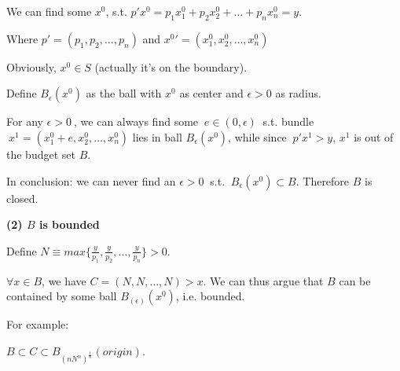 \documentclass{article}
\begin{document}
\vspace{2mm}

We can find some $x^0$, s.t. $p'x^0 = p_1x^0_1 + p_2x^0_2 + \ldots + p_nx^0_n = y$.

Where $p' = (p_1, p_2, \ldots, p_n)$ and ${x^0}' = (x^0_1, x^0_2, \ldots, x^0_n)$

Obviously, $x^0 \in  S$ (actually it's on the boundary).

\medskip

Define $B_{\epsilon}(x^0)$ as the ball with $x^0$ as center and $\epsilon > 0$ as radius.

For any $\epsilon > 0 \ $, we can always find some $ \ e \in (0, \epsilon) \ $ s.t. bundle 
$\ x^1 = (x^0_1 + e, x^0_2, \ldots, x^0_n)$ lies in ball $B_{\epsilon}(x^0)$, while since $\ p'x^1 > y$, 
$x^1$ is out of the budget set $B$.

\medskip

In conclusion: we can never find an $\epsilon > 0 \ $ s.t. $\ B_{\epsilon}(x^0) \subset B$. Therefore
$B$ is closed.

\bigskip

\textbf{(2) $B$ is bounded}

Define $N \equiv max\{\frac{y}{p_1},\frac{y}{p_2},\ldots, \frac{y}{p_n}\} > 0$.

$\forall x \in B$, we have $C = (N,N, \ldots, N) > x$. We can thus argue that $B$
can be contained by some ball  $B_{(\epsilon)}(x^0)$, i.e. bounded.

\begin{mdframed}[backgroundcolor=blue!20,linecolor=white]
For example:

{\centering
{}
\label{fig:1_15_bounded}}

\vspace{2mm}

$B \subset C \subset B_{(nN^n)^{\frac{1}{n}}}(origin)$.
\end{mdframed}
\end{document}
